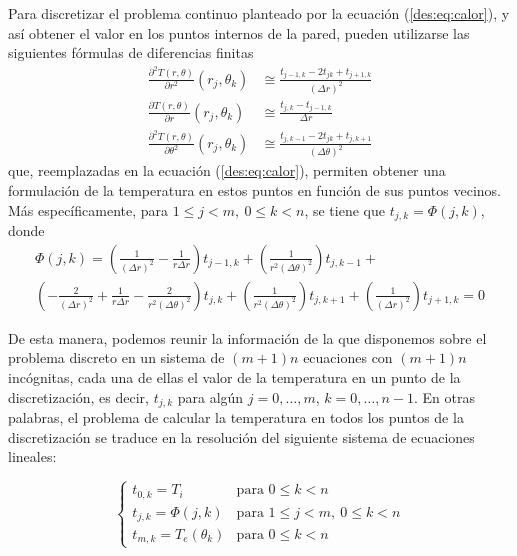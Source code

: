         Para discretizar el problema continuo planteado por la ecuación (\ref{des:eq:calor}), y así obtener el valor en los puntos internos de la pared, pueden utilizarse las siguientes fórmulas de diferencias finitas
        \begin{align*}
            \frac{\partial^2 T(r, \theta)}{\partial r^2}(r_j, \theta_k) &\cong \frac{t_{j-1,k} - 2 t_{jk} + t_{j+1,k}}{(\Delta r)^2} \\
            \frac{\partial T(r, \theta)}{\partial r}(r_j, \theta_k) &\cong \frac{t_{j,k} - t_{j-1,k}}{\Delta r} \\
            \frac{\partial^2 T(r, \theta)}{\partial \theta^2}(r_j, \theta_k) &\cong \frac{t_{j,k-1} - 2 t_{jk} + t_{j,k+1}}{(\Delta \theta)^2} 
        \end{align*}
        que, reemplazadas en la ecuación (\ref{des:eq:calor}), permiten obtener una formulación de la temperatura en estos puntos en función de sus puntos vecinos. Más específicamente, para $1 \leq j < m,\ 0 \leq k < n$, se tiene que $t_{j,k} = \Phi(j,k)$, donde
        \begin{multline*}
            \Phi(j,k) = \left( \frac{1}{(\Delta r)^2} - \frac{1}{r \Delta r} \right) t_{j-1,k} +
                \left( \frac{1}{r^2(\Delta \theta)^2} \right) t_{j,k-1} + \\
                \left( - \frac{2}{(\Delta r)^2} + \frac{1}{r \Delta r} - \frac{2}{r^2(\Delta \theta)^2} \right) t_{j,k} +
                \left( \frac{1}{r^2(\Delta \theta)^2} \right) t_{j,k+1} +
                \left( \frac{1}{(\Delta r)^2} \right) t_{j+1,k} = 0
        \end{multline*}

        De esta manera, podemos reunir la información de la que disponemos sobre el problema discreto en un sistema de $(m+1)n$ ecuaciones con $(m+1)n$ incógnitas, cada una de ellas el valor de la temperatura en un punto de la discretización, es decir, $t_{j,k}$ para algún $j = 0, \dots, m$, $k = 0, \dots, n-1$. En otras palabras, el problema de calcular la temperatura en todos los puntos de la discretización se traduce en la resolución del siguiente sistema de ecuaciones lineales:

        \begin{equation} \label{des:eq:sistema}
            \begin{cases}
                t_{0,k} = T_i
                    & \text{para } 0 \leq k < n \\
                t_{j,k} = \Phi(j,k)
                    & \text{para } 1 \leq j < m,\ 0 \leq k < n \\
                t_{m,k} = T_e(\theta_k)
                    & \text{para } 0 \leq k < n
            \end{cases}
        \end{equation}

